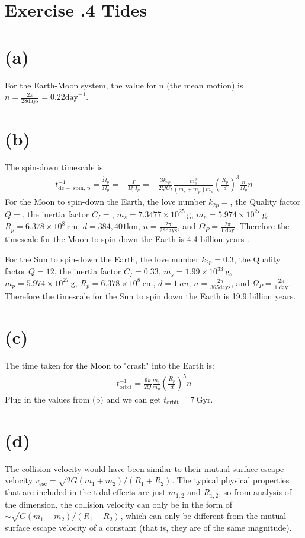 \documentclass[a4paper,12pt]{article}
\newcommand{\cm}{\mathrm{cm}}
\newcommand{\g}{\mathrm{g}}
\begin{document}
\section*{\textbf{Exercise \uppercase\expandafter{}.4 Tides}}
\section*{(a)}
For the Earth-Moon system, the value for n (the mean motion) is $n = \frac{2\pi}{28 \text{days}} = 0.22 \text{day}^{-1}$.

\section*{(b)}
The spin-down timescale is:
\begin{align*}
    t_{\mathrm{de}-\text { spin, } \mathrm{p}}^{-1}=\frac{\dot{\Omega}_p}{\Omega_p}=-\frac{\Gamma}{\Omega_p I_p}=-\frac{3 k_{2 p}}{2 Q C_I} \frac{m_s^2}{\left(m_s+m_p\right) m_p}\left(\frac{R_p}{d}\right)^3 \frac{n}{\Omega_p} n
\end{align*}
For the Moon to spin-down the Earth, the love number $k_{2p} = $, the Quality factor $Q = $, 
the inertia factor $C_I = $, $m_s = 7.3477\times 10^{25} \ \g$, $m_p =5.974\times 10^{27} \ \g $, $R_p = 6.378\times 10^8 \ \cm$, $d = 384,401 \text{km}$, $n = \frac{2\pi}{28 \text{days}}$, and $\Omega_P = \frac{2\pi}{1 \ \text{day}}$. 
Therefore the timescale for the Moon to spin down the Earth is 4.4 billion years .

For the Sun to spin-down the Earth, the love number $k_{2p} = 0.3$, the Quality factor $Q = 12$, 
the inertia factor $C_I = 0.33$, $m_s = 1.99\times 10^{33}\ \g$, $m_p =5.974\times 10^{27} \ \g $, $R_p = 6.378\times 10^8 \ \cm$, $d = 1 \ au$, $n = \frac{2\pi}{365 \text{days}}$, and $\Omega_P = \frac{2\pi}{1 \ \text{day}}$.
Therefore the timescale for the Sun to spin down the Earth is 19.9 billion years.

\section*{(c)}
The time taken for the Moon to "crash" into the Earth is:
\begin{align*}
    t_{\text{orbit}}^{-1} = \frac{9k}{2Q} \frac{m_s}{m_p} (\frac{R_p}{d})^5 n
\end{align*}
Plug in the values from (b) and we can get $t_{\text{orbit}} = 7 \ \text{Gyr}$.

\section*{(d)}
The collision velocity would have been similar to their mutual surface escape velocity 
$v_{\text{esc}} = \sqrt{2G(m_1 + m_2)/(R_1 + R_2)}$. The typical physical properties 
that are included in the tidal effects are just $m_{1,2}$ and $R_{1,2}$, so from analysis of the dimension, 
the collision velocity can only be in the form of $\sim \sqrt{G(m_1 + m_2)/(R_1 + R_2)}$, which can only 
be different from the mutual surface escape velocity of a constant (that is, they are of the same magnitude).
\end{document}
